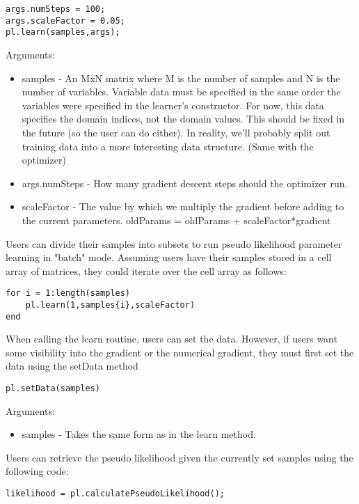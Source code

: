 \begin{lstlisting}
args.numSteps = 100;
args.scaleFactor = 0.05;
pl.learn(samples,args);
\end{lstlisting}

Arguments:
\begin{itemize}
\item samples - An MxN matrix where M is the number of samples and N is the number of variables.  Variable data must be specified in the same order the variables were specified in the learner's constructor.  For now, this data specifies the domain indices, not the domain values.  This should be fixed in the future (so the user can do either).  In reality, we'll probably split out training data into a more interesting data structure.  (Same with the optimizer) 
\item args.numSteps - How many gradient descent steps should the optimizer run. 
\item scaleFactor - The value by which we multiply the gradient before adding to the current parameters.  oldParams = oldParams + scaleFactor*gradient
\end{itemize}


Users can divide their samples into subsets to run pseudo likelihood parameter learning in "batch" mode.  Assuming users have their samples stored in a cell array of matrices, they could iterate over the cell array as follows:

\begin{lstlisting}
for i = 1:length(samples)
    pl.learn(1,samples{i},scaleFactor)
end
\end{lstlisting}

When calling the learn routine, users can set the data.  However, if users want some visibility into the gradient or the numerical gradient, they must first set the data using the setData method

\begin{lstlisting}
pl.setData(samples)
\end{lstlisting}

Arguments:
\begin{itemize}
\item samples - Takes the same form as in the learn method.
\end{itemize}

Users can retrieve the pseudo likelihood given the currently set samples using the following code:

\begin{lstlisting}
likelihood = pl.calculatePseudoLikelihood();
\end{lstlisting}

